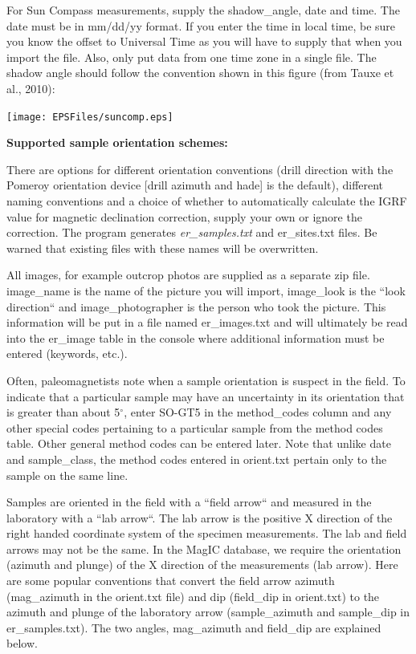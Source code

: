 \documentclass[11pt]{book}
\begin{document}
{{ For Sun Compass measurements, supply the shadow\_angle, date and time. The date must be in mm/dd/yy format. If you enter the time in local time, be sure you know the offset to Universal Time as you will have to supply that when you import the file. Also, only put data from one time zone in a single file. The shadow angle should follow the convention shown in this figure (from Tauxe et al., 2010): \nocite{tauxe10}

  \texttt{[image: EPSFiles/suncomp.eps]}


{\bf Supported sample orientation schemes:}

  There are options for
 different orientation conventions (drill direction with the Pomeroy orientation device  [drill azimuth and hade] is the default), different naming conventions and a choice of whether to automatically calculate the IGRF value for magnetic declination correction, supply your own or ignore the correction.  The program generates {\it er\_samples.txt} and {er\_sites.txt} files.  Be warned that existing files with these names will be overwritten.

 All images, for example outcrop photos are supplied as a separate zip file. image\_name is the name of the picture you will import, image\_look is the ``look direction`` and image\_photographer is the person who took the picture. This information will be put in a file named er\_images.txt and will ultimately be read into the er\_image table in the console where additional information must be entered (keywords, etc.).

Often, paleomagnetists note when a sample orientation is suspect in the field. To indicate that a particular sample may have an uncertainty in its orientation that is greater than about 5$^{\circ}$, enter SO-GT5 in the method\_codes column and any other special codes pertaining to a particular sample from the method codes table. Other general method codes can be entered later. Note that unlike date and sample\_class, the method codes entered in orient.txt pertain only to the sample on the same line.

Samples are oriented in the field with a ``field arrow`` and measured in the laboratory with a ``lab arrow``. The lab arrow is the positive X direction of the right handed coordinate system of the specimen measurements. The lab and field arrows may not be the same. In the MagIC database, we require the orientation (azimuth and plunge) of the X direction of the measurements (lab arrow). Here are some popular conventions that convert the field arrow azimuth (mag\_azimuth in the orient.txt file) and dip (field\_dip in orient.txt) to the azimuth and plunge of the laboratory arrow (sample\_azimuth and sample\_dip in er\_samples.txt). The two angles, mag\_azimuth and field\_dip are explained below.

}}
\end{document}
